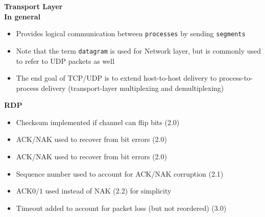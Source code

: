 \documentclass[a4paper]{article} \usepackage[backend=biber, style=numeric, sorting=none]{biblatex}
\begin{document}
\begin{multicols*}{4}
{\small\textbf{Transport Layer}} \\
\textbf{In general}
\begin{itemize}[leftmargin=*]
\item Provides logical communication between \texttt{processes} by sending \texttt{segments}
\item Note that the term \texttt{datagram} is used for Network layer, but is commonly used to refer to UDP packets as well
\item The end goal of TCP/UDP is to extend host-to-host delivery to process-to-process delivery (transport-layer multiplexing and demultiplexing)
\end{itemize}

\textbf{RDP}
\begin{itemize}[leftmargin=*]
\item Checksum implemented if channel can flip bits (2.0)
\item ACK/NAK used to recover from bit errors (2.0)
\item ACK/NAK used to recover from bit errors (2.0)
\item Sequence number used to account for ACK/NAK corruption (2.1)
\item ACK$0/1$ used instead of NAK (2.2) for simplicity
\item Timeout added to account for packet loss (but not reordered) (3.0)
\end{itemize}


\end{multicols*}
\end{document}
